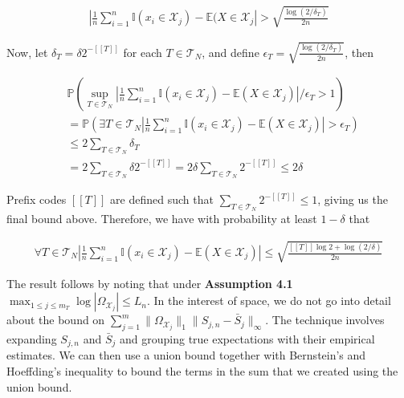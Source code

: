 \begin{align}
    \left| \frac{1}{n} \sum_{i=1}^n \mathbb{I}(x_i \in \mathcal{X}_j) - 
      \mathbb{E}(X \in \mathcal{X}_j
    \right|
    > \sqrt{\frac{\log(2/\delta_T)}{2n}}
\end{align}

Now, let $\delta_T = \delta 2^{-[[T]]}$ for each $T \in
\mathcal{T}_N$, and define $\epsilon_T =
\sqrt{\frac{\log(2/\delta_T)}{2n}}$, then

\begin{align}
  &\mathbb{P} \left(
    \sup_{T \in \mathcal{T}_N}
    \left|
      \frac{1}{n} \sum_{i=1}^n \mathbb{I}(x_i \in \mathcal{X}_j) - \mathbb{E}(X \in \mathcal{X}_j)
    \right| / \epsilon_T
    > 1
  \right) \\
  &= \mathbb{P} \left(
    \exists T \in \mathcal{T}_N
    \left|
      \frac{1}{n} \sum_{i=1}^n \mathbb{I}(x_i \in \mathcal{X}_j) - \mathbb{E}(X \in \mathcal{X}_j)
    \right|
    > \epsilon_T
  \right) \\
  &\le 2 \sum_{T \in \mathcal{T}_N} \delta_T \\
  &= 2 \sum_{T \in \mathcal{T}_N} \delta 2^{-[[T]]}
  = 2 \delta \sum_{T \in \mathcal{T}_N} 2^{-[[T]]}
  \le 2 \delta
\end{align}

Prefix codes $[[T]]$ are defined such that $\sum_{T \in \mathcal{T}_N}
2^{-[[T]]} \le 1$, giving us the final bound above. Therefore, we have
with probability at least $1 - \delta$ that

\begin{align}
  \forall T \in \mathcal{T}_N
  \left|
    \frac{1}{n} \sum_{i=1}^n \mathbb{I}(x_i \in \mathcal{X}_j) - \mathbb{E}(X \in \mathcal{X}_j)
  \right|
  \le \sqrt{\frac{[[T]] \log 2 + \log(2/\delta)}{2n}}
\end{align}

The result follows by noting that under \textbf{Assumption 4.1}
$\max_{1\le j\le m_T} \log|\Omega_{\mathcal{X}_j}| \le L_n$. In the
interest of space, we do not go into detail about the bound on
$\sum_{j=1}^m \|\Omega_{\mathcal{X}_j}\|_1 \|S_{j,n} -
\bar{S}_j\|_\infty$. The technique involves expanding $S_{j,n}$ and
$\bar{S}_j$ and grouping true expectations with their empirical
estimates. We can then use a union bound together with Bernstein's and
Hoeffding's inequality to bound the terms in the sum that we created
using the union bound.
